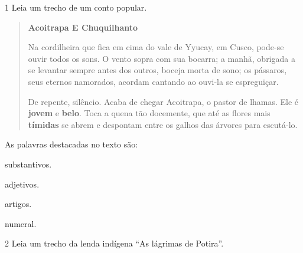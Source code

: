 
\num{1} Leia um trecho de um conto popular.

\begin{quote}
\textbf{Acoitrapa E Chuquilhanto}

Na cordilheira que fica em cima do vale de Yyucay, em Cusco,
pode-se ouvir todos os sons. O vento sopra com sua bocarra;
a manhã, obrigada a se levantar sempre antes dos outros,
boceja morta de sono; os pássaros, seus eternos namorados,
acordam cantando ao ouvi-la se espreguiçar.

De repente, silêncio. Acaba de chegar Acoitrapa, o
pastor de lhamas. Ele é \textbf{jovem} e \textbf{belo}. Toca a quena tão
docemente, que até as flores mais \textbf{tímidas} se abrem e
despontam entre os galhos das árvores para escutá-lo. 
\end{quote}


As palavras destacadas no texto são:

\begin{escolha}
\item substantivos.

\item adjetivos.

\item artigos.

\item numeral.
\end{escolha}


\num{2} Leia um trecho da lenda indígena ``As lágrimas de Potira''.

